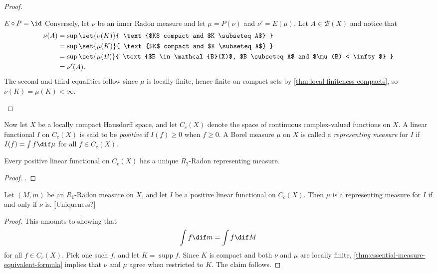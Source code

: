 \documentclass[article, a4paper, 11pt, oneside]{memoir}
\numberwithin{equation}{chapter}
\newcommand{\calB}{\mathcal{B}}
\newcommand{\borel}[1]{\calB(#1)}
\DeclareMathOperator{\supp}{supp}
\begin{document}
\begin{proof}
\begin{proofsec}
    \item[$E \circ P = \id$]
    Conversely, let $\nu$ be an inner Radon measure and let $\mu = P(\nu)$ and $\nu' = E(\mu)$. Let $A \in \borel{X}$ and notice that
    \begin{align*}
        \nu(A)
            &= \sup \set{\nu(K)}{ \text{$K$ compact and $K \subseteq A$} } \\
            &= \sup \set{\mu(K)}{ \text{$K$ compact and $K \subseteq A$} } \\
            &= \sup \set{\mu(B)}{ \text{$B \in \borel{X}$, $B \subseteq A$ and $\mu(B) < \infty$} } \\
            &= \nu'(A).
    \end{align*}
    The second and third equalities follow since $\mu$ is locally finite, hence finite on compact sets by \cref{thm:local-finiteness-compacts}, so $\nu(K) = \mu(K) < \infty$.
\end{proofsec}
\end{proof}



Now let $X$ be a locally compact Hausdorff space, and let $C_c(X)$ denote the space of continuous complex-valued functions on $X$. A linear functional $I$ on $C_c(X)$ is said to be \emph{positive} if $I(f) \geq 0$ when $f \geq 0$. A Borel measure $\mu$ on $X$ is called a \emph{representing measure} for $I$ if $I(f) = \int f \dif\mu$ for all $f \in C_c(X)$.

\begin{theorem}
    Every positive linear functional on $C_c(X)$ has a unique $R_2$-Radon representing measure.
\end{theorem}

\begin{proof}
    \textcite[Theorem~7.2]{folland2007}.
\end{proof}

\begin{proposition}
    Let $(M,m)$ be an $R_1$-Radon measure on $X$, and let $I$ be a positive linear functional on $C_c(X)$. Then $\mu$ is a representing measure for $I$ if and only if $\nu$ is. [Uniqueness?]
\end{proposition}

\begin{proof}
    This amounts to showing that
    \begin{equation*}
        \int f \dif m = \int f \dif M
    \end{equation*}
    for all $f \in C_c(X)$. Pick one such $f$, and let $K = \supp f$. Since $K$ is compact and both $\nu$ and $\mu$ are locally finite, \cref{thm:essential-measure-equivalent-formula} implies that $\nu$ and $\mu$ agree when restricted to $K$. The claim follows.
\end{proof}
\end{document}
